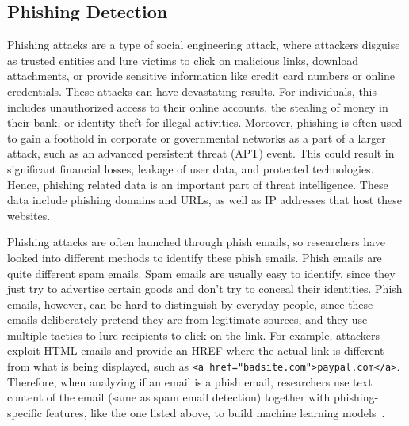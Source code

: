 \subsection{Phishing Detection}
Phishing attacks are a type of social engineering attack, where attackers 
disguise as trusted entities and lure victims to click on malicious links, 
download attachments, or provide sensitive information like credit card
numbers or online credentials. These attacks can have devastating results. 
For individuals, this includes unauthorized access to their online 
accounts, the stealing of money in their bank, or identity theft for illegal
activities. Moreover, phishing is often used to gain a foothold in corporate 
or governmental networks as a part of a larger attack, such as an 
advanced persistent threat (APT) event. This could result in significant
financial losses, leakage of user data, and protected technologies. Hence,
phishing related data is an important part of threat intelligence. These data
include phishing domains and URLs, as well as IP addresses that host these
websites. 

Phishing attacks are often launched through phish emails, so researchers
have looked into different methods to identify these phish emails. Phish emails
are quite different spam emails. Spam emails are usually easy to identify,
since they just try to advertise certain goods and don't try to conceal 
their identities. Phish emails, however, can be hard to distinguish by 
everyday people, since these emails deliberately pretend they are
from legitimate sources, and they use multiple tactics to lure recipients
to click on the link. For example, attackers exploit HTML emails and
provide an HREF where the actual link is different from what is being 
displayed, such as \texttt{<a href="badsite.com">paypal.com</a>}. Therefore,
when analyzing if an email is a phish email, researchers use text content
of the email (same as spam email detection) together with phishing-specific 
features, like the one listed above, to build machine learning models~\cite{fette2007learning, abu2007comparison, chandrasekaran2006phishing}.


